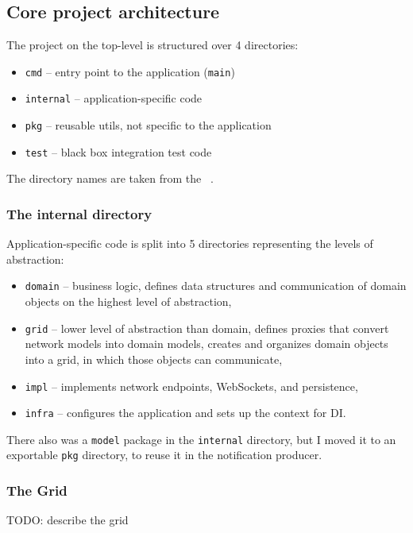 \subsection{Core project architecture}\label{sec:core-project-architecture}

The project on the top-level is structured over 4 directories:

\begin{itemize}
      \item
            \texttt{cmd} -- entry point to the application (\texttt{main})
      \item
            \texttt{internal} -- application-specific code
      \item
            \texttt{pkg} -- reusable utils, not specific to the application
      \item
            \texttt{test} -- black box integration test code
\end{itemize}

The directory names are taken
from the ~\cite{quest_standard_2022}.

\subsubsection{The internal directory}\label{sec:the-internal-directory}

Application-specific code is split into 5 directories
representing the levels of abstraction:

\begin{itemize}
      \item
            \texttt{domain} -- business logic,
            defines data structures and communication of domain objects
            on the highest level of abstraction,
      \item
            \texttt{grid} -- lower level of abstraction than domain,
            defines proxies that convert network models into domain models,
            creates and organizes domain objects into a grid,
            in which those objects can communicate,
      \item
            \texttt{impl} -- implements network endpoints,
            WebSockets, and persistence,
      \item
            \texttt{infra} -- configures the application
            and sets up the context for DI.
\end{itemize}

There also was a \texttt{model} package
in the \texttt{internal} directory,
but I moved it to an exportable \texttt{pkg} directory,
to reuse it in the notification producer.

\subsubsection{The Grid}\label{sec:the-grid}

TODO: describe the grid
